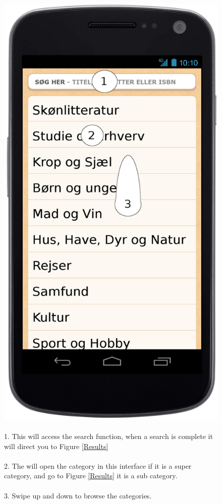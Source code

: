 \message{ !name(Rapport.tex)}\documentclass[12pt]{article}
\begin{document}
\begin{figure}
\includegraphics[scale=0.7]{gnexsoegeogbrowse.png}
\caption{
\\
1. This will access the search function, when a search is complete it will direct you to Figure \ref{Results}\\\\
2. The will open the category in this interface if it is a super category, and go to Figure \ref{Results} it is a sub category.\\\\
3. Swipe up and down to browse the categories.
}
\label{Categories}
\end{figure}
\end{document}
